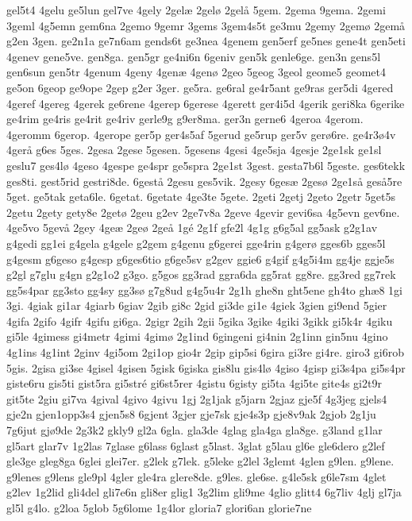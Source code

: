 {gel5t4
4gelu
ge5lun
gel7ve
4gely
2gelæ
2gelø
2gelå
5gem.
2gema
9gema.
2gemi
3geml
4g5emn
gem6na
2gemo
9gemr
3gems
3gem4s5t
ge3mu
2gemy
2gemø
2gemå
g2en
3gen.
ge2n1a
ge7n6am
gends6t
ge3nea
4genem
gen5erf
ge5nes
gene4t
gen5eti
4genev
gene5ve.
gen8ga.
gen5gr
ge4ni6n
6geniv
gen5k
genle6ge.
gen3n
gens5l
gen6sun
gen5tr
4genum
4geny
4genæ
4genø
2geo
5geog
3geol
geome5
geomet4
ge5on
6geop
ge9ope
2gep
g2er
3ger.
ge5ra.
ge6ral
ge4r5ant
ge9ras
ger5di
4gered
4geref
4gereg
4gerek
ge6rene
4gerep
6gerese
4gerett
ger4i5d
4gerik
geri8ka
6gerike
ge4rim
ge4ris
ge4rit
ge4riv
gerle9g
g9er8ma.
ger3n
gerne6
4geroa
4gerom.
4geromm
6gerop.
4gerope
ger5p
ger4s5af
5gerud
ge5rup
ger5v
gerø6re.
ge4r3ø4v
4gerå
g6es
5ges.
2gesa
2gese
5gesen.
5gesens
4gesi
4ge5sja
4gesje
2ge1sk
ge1sl
geslu7
ges4lø
4geso
4gespe
ge4spr
ge5spra
2ge1st
3gest.
gesta7b6l
5geste.
ges6tekk
ges8ti.
gest5rid
gestri8de.
6gestå
2gesu
ges5vik.
2gesy
6gesæ
2gesø
2ge1så
geså5re
5get.
ge5tak
geta6le.
6getat.
6getate
4ge3te
5gete.
2geti
2getj
2geto
2getr
5get5s
2getu
2gety
gety8e
2getø
2geu
g2ev
2ge7v8a
2geve
4gevir
gevi6sa
4g5evn
gev6ne.
4ge5vo
5gevå
2gey
4geæ
2geø
2geå
1gé
2g1f
gfe2l
4g1g
g6g5al
gg5ask
g2g1av
g4gedi
gg1ei
g4gela
g4gele
g2gem
g4genu
g6gerei
gge4rin
g4gerø
gges6b
gges5l
g4gesm
g6geso
g4gesp
g6ges6tio
g6ge5sv
g2gev
ggie6
g4gif
g4g5i4m
gg4je
ggje5s
g2gl
g7glu
g4gn
g2g1o2
g3go.
g5gos
gg3rad
ggra6da
gg5rat
gg8re.
gg3red
gg7rek
gg5s4par
gg3sto
gg4sy
gg3sø
g7g8ud
g4g5u4r
2g1h
ghe8n
ght5ene
gh4to
ghæ8
1gi
3gi.
4giak
gi1ar
4giarb
6giav
2gib
gi8c
2gid
gi3de
gi1e
4giek
3gien
gi9end
5gier
4gifa
2gifo
4gifr
4gifu
gi6ga.
2gigr
2gih
2gii
5gika
3gike
4giki
3gikk
gi5k4r
4giku
gi5le
4gimess
gi4metr
4gimi
4gimø
2g1ind
6gingeni
gi4nin
2g1inn
gin5nu
4gino
4g1ins
4g1int
2ginv
4gi5om
2gi1op
gio4r
2gip
gip5si
6gira
gi3re
gi4re.
giro3
gi6rob
5gis.
2gisa
gi3se
4gisel
4gisen
5gisk
6giska
gis8lu
gis4lø
4giso
4gisp
gi3s4pa
gi5s4pr
giste6ru
gis5ti
gist5ra
gi5stré
gi6st5rer
4gistu
6gisty
gi5ta
4gi5te
gite4s
gi2t9r
git5te
2giu
gi7va
4gival
4givo
4givu
1gj
2g1jak
g5jarn
2gjaz
gje5f
4g3jeg
gjels4
gje2n
gjen1opp3s4
gjen5s8
6gjent
3gjer
gje7sk
gje4s3p
gje8v9ak
2gjob
2g1ju
7g6jut
gjø9de
2g3k2
gkly9
gl2a
6gla.
gla3de
4glag
gla4ga
gla8ge.
g3land
g1lar
gl5art
glar7v
1g2las
7glase
g6lass
6glast
g5last.
3glat
g5lau
gl6e
gle6dero
g2lef
gle3ge
gleg8ga
6glei
glei7er.
g2lek
g7lek.
g5leke
g2lel
3glemt
4glen
g9len.
g9lene.
g9lenes
g9lens
gle9pl
4gler
gle4ra
glere8de.
g9les.
gle6se.
g4le5sk
g6le7sm
4glet
g2lev
1g2lid
gli4del
gli7e6n
gli8er
glig1
3g2lim
gli9me
4glio
glitt4
6g7liv
4glj
gl7ja
gl5l
g4lo.
g2loa
5glob
5g6lome
1g4lor
gloria7
glori6an
glorie7ne
}
